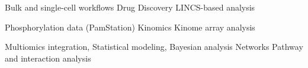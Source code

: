 {Bulk and single-cell workflows}
{Drug Discovery}
{LINCS-based analysis}

{Phosphorylation data (PamStation)}
{Kinomics}
{Kinome array analysis}

{Multiomics integration, Statistical modeling, Bayesian analysis}
{Networks}
{Pathway and interaction analysis}
